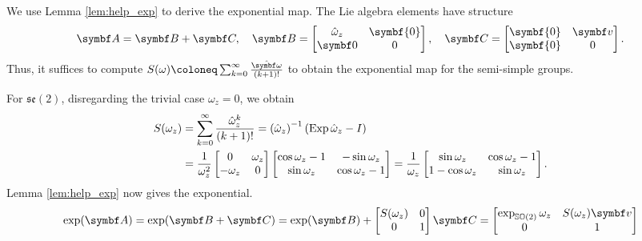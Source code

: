 We use Lemma \ref{lem:help_exp} to derive the exponential map. The Lie algebra elements have structure
\begin{equation}
  \A = \B + \C, \quad \B = \begin{bmatrix} \hat \omega_{z} & \symbf{0} \\ \symbf 0 & 0 \end{bmatrix}, \quad \C = \begin{bmatrix} \symbf{0} & \bv \\ \symbf{0} & 0 \end{bmatrix}.
\end{equation}
Thus, it suffices to compute $S(\omega) \coloneq \sum_{k = 0}^\infty \frac{\hat \bomega}{(k+1)!}$ to obtain the exponential map for the semi-simple groups.

For $\mathfrak{se}(2)$, disregarding the trivial case $\omega_{z} = 0$, we obtain
\begin{equation}
  \begin{aligned}
    S(\omega_z)
     & = \sum_{k = 0}^\infty \frac{\hat \omega_z^k}{(k+1)!} = \left( \hat \omega_z \right)^{-1} \left( \operatorname{Exp} \hat \omega_z - I \right) \\
     & = \frac{1}{\omega_z^2} \begin{bmatrix}
      0 & \omega_z \\ -\omega_z & 0
    \end{bmatrix} \begin{bmatrix}
      \cos \omega_z - 1 & -\sin \omega_z \\ \sin \omega_z & \cos \omega_z - 1
    \end{bmatrix} =  \frac{1}{\omega_z}\begin{bmatrix}
      \sin \omega_z     & \cos \omega_z - 1 \\
      1 - \cos \omega_z & \sin \omega_z
    \end{bmatrix}.
  \end{aligned}
\end{equation}
Lemma \ref{lem:help_exp} now gives the exponential.
\begin{equation}
  \label{eq:6}
  \exp(\A) = \exp(\B + \C) = \exp(\B) + \begin{bmatrix} S(\omega_{z}) & 0 \\ 0 & 1 \end{bmatrix} \C = \begin{bmatrix} \exp_{\SOtwo} \omega_{z} & S(\omega_{z}) \bv \\ 0 & 1 \end{bmatrix}
\end{equation}


